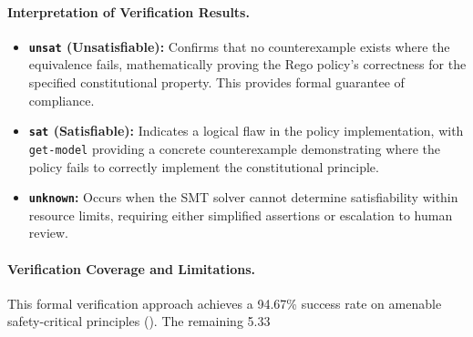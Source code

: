 \documentclass[manuscript,screen,9pt]{acmart}
\begin{document}
\paragraph{Interpretation of Verification Results.}
\begin{itemize}[leftmargin=*,itemsep=2pt,parsep=1pt]
	\item \textbf{\texttt{unsat} (Unsatisfiable):} Confirms that no counterexample exists where the equivalence fails, mathematically proving the Rego policy's correctness for the specified constitutional property. This provides formal guarantee of compliance.
	\item \textbf{\texttt{sat} (Satisfiable):} Indicates a logical flaw in the policy implementation, with \texttt{get-model} providing a concrete counterexample demonstrating where the policy fails to correctly implement the constitutional principle.
	\item \textbf{\texttt{unknown}:} Occurs when the SMT solver cannot determine satisfiability within resource limits, requiring either simplified assertions or escalation to human review.
\end{itemize}

\paragraph{Verification Coverage and Limitations.} This formal verification approach achieves a 94.67\% success rate on amenable safety-critical principles (). The remaining 5.33%

\end{document}
